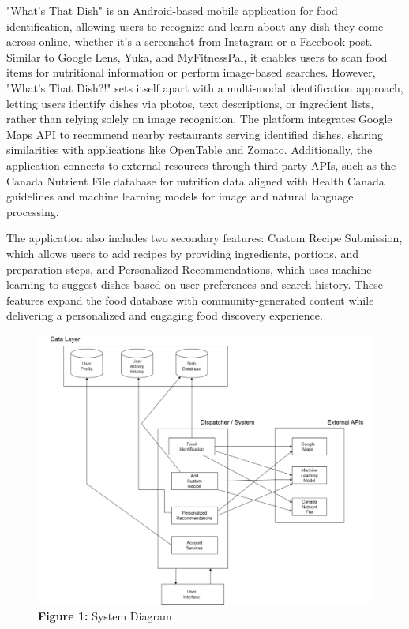 \documentclass[]{article}
\begin{document}
"What’s That Dish" is an Android-based mobile application for food identification, allowing users to recognize and learn about any dish they come across online, whether it's a screenshot from Instagram or a Facebook post. Similar to Google Lens, Yuka, and MyFitnessPal, it enables users to scan food items for nutritional information or perform image-based searches. However, "What’s That Dish?!" sets itself apart with a multi-modal identification approach, letting users identify dishes via photos, text descriptions, or ingredient lists, rather than relying solely on image recognition. The platform integrates Google Maps API to recommend nearby restaurants serving identified dishes, sharing similarities with applications like OpenTable and Zomato. Additionally, the application connects to external resources through third-party APIs, such as the Canada Nutrient File database for nutrition data aligned with Health Canada guidelines and machine learning models for image and natural language processing.

The application also includes two secondary features: Custom Recipe Submission, which allows users to add recipes by providing ingredients, portions, and preparation steps, and Personalized Recommendations, which uses machine learning to suggest dishes based on user preferences and search history. These features expand the food database with community-generated content while delivering a personalized and engaging food discovery experience.


\begin{figure}[H]
    \centering
    \includegraphics[width=\textwidth]{image/2.1_Diagram.pdf}
    \caption{\textbf{Figure 1:} System Diagram}
\end{figure}
\end{document}
